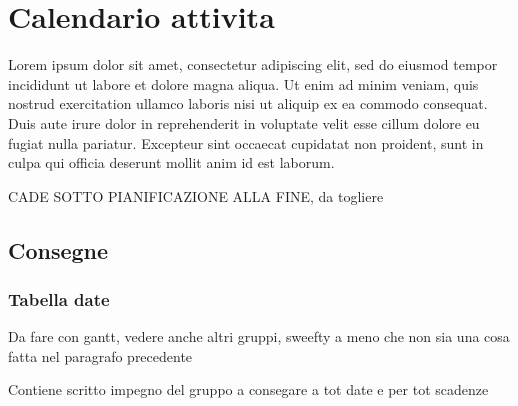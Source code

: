 \newpage
\section{Calendario attivita} \label{CalendarioAttivita}

	Lorem ipsum dolor sit amet, consectetur adipiscing elit, sed do eiusmod tempor incididunt ut labore et dolore magna aliqua. Ut enim ad minim veniam, quis nostrud exercitation ullamco laboris nisi ut aliquip ex ea commodo consequat. Duis aute irure dolor in reprehenderit in voluptate velit esse cillum dolore eu fugiat nulla pariatur. Excepteur sint occaecat cupidatat non proident, sunt in culpa qui officia deserunt mollit anim id est laborum.

	CADE SOTTO PIANIFICAZIONE ALLA FINE, da togliere
	
	\subsection{Consegne}
		\subsubsection{Tabella date}

	Da fare con gantt, vedere anche altri gruppi, sweefty a meno che non sia una cosa fatta nel paragrafo precedente

	Contiene scritto impegno del gruppo a consegare a tot date e per tot scadenze